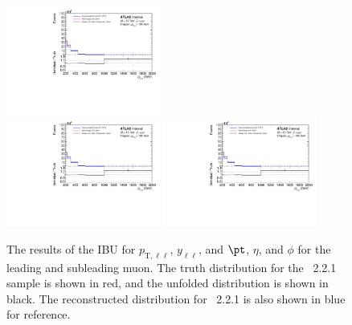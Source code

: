 \begin{figure}[h!]
  \includegraphics[page=82,width=0.45\textwidth]{figures/IBUPlots.pdf} \\
  \includegraphics[page=83,width=0.45\textwidth]{figures/IBUPlots.pdf}
  \includegraphics[page=84,width=0.45\textwidth]{figures/IBUPlots.pdf} \\
  \caption{The results of the IBU for $p_{\text{T},\ell\ell}$, $y_{\ell\ell}$, and $\pt$, $\eta$, and $\phi$ for the leading and subleading muon. The truth distribution for the \sherpa~2.2.1 sample is shown in red, and the unfolded distribution is shown in black. The reconstructed distribution for \sherpa~2.2.1 is also shown in blue for reference.}
  \label{fig:UnfoldIBUDilep}
\end{figure}

